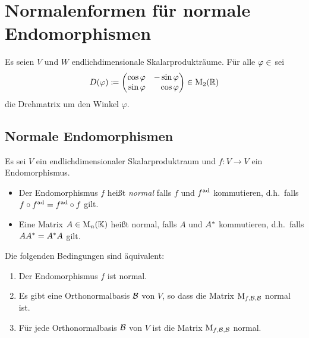 \chapter{Normalenformen für normale Endomorphismen}

Es seien $V$ und $W$ endlichdimensionale Skalarprodukträume.
Für alle $\varphi \in \real$ sei
\[
            D(\varphi)
  \coloneqq \begin{pmatrix*}[r]
              \cos \varphi  & -\sin \varphi \\
              \sin \varphi  &  \cos \varphi
            \end{pmatrix*}
  \in       \matrices{2}{\Real}
\]
die Drehmatrix um den Winkel $\varphi$.





\section{Normale Endomorphismen}

Es sei $V$ ein endlichdimensionaler Skalarproduktraum und $f \colon V \to V$ ein Endomorphismus.

\begin{definition}
  \leavevmode
  \begin{itemize}
    \item
      Der Endomorphismus $f$ heißt \emph{normal} falls $f$ und $f^{\operatorname{ad}}$ kommutieren, d.h.\ falls $f \circ f^{\operatorname{ad}} = f^{\operatorname{ad}} \circ f$ gilt.
    \item
      Eine Matrix $A \in \operatorname{M}_{n}(\mathbb{K})$ heißt normal, falls $A$ und $A^*$ kommutieren, d.h.\ falls $A A^* = A^* A$ gilt.
  \end{itemize}
\end{definition}

\begin{lemma}
  Die folgenden Bedingungen sind äquivalent:
  \begin{enumerate}
    \item
      Der Endomorphismus $f$ ist normal.
    \item
      Es gibt eine Orthonormalbasis $\mathcal{B}$ von $V$, so dass die Matrix $\operatorname{M}_{f, \mathcal{B}, \mathcal{B}}$ normal ist.
    \item
      Für jede Orthonormalbasis $\mathcal{B}$ von $V$ ist die Matrix $\operatorname{M}_{f, \mathcal{B}, \mathcal{B}}$ normal.
  \end{enumerate}
\end{lemma}



